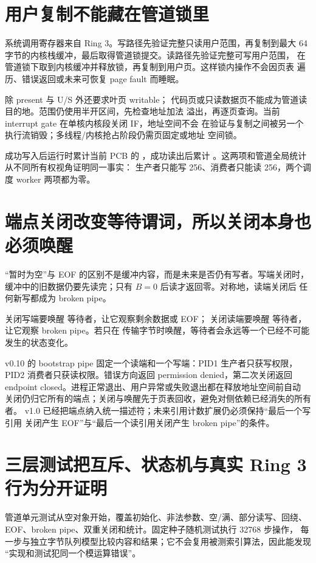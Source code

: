 \section{用户复制不能藏在管道锁里}

系统调用寄存器来自 Ring 3。写路径先验证完整只读用户范围，再复制到最大
64 字节的内核栈缓冲，最后取得管道锁提交。读路径先验证完整可写用户范围，
在管道锁下取到内核缓冲并释放锁，再复制到用户页。这样锁内操作不会因页表
遍历、错误返回或未来可恢复 page fault 而睡眠。

 除 present 与 U/S 外还要求叶页 writable；
代码页或只读数据页不能成为管道读目的地。范围仍使用半开区间，先检查地址加法
溢出，再逐页查询。当前 interrupt gate 在单核内核段关闭 IF，地址空间不会
在验证与复制之间被另一个执行流销毁；多线程/内核抢占阶段仍需页固定或地址
空间锁。

成功写入后运行时累计当前 PCB 的 ，成功读出后累计
。这两项和管道全局统计从不同所有权视角证明同一事实：
生产者只能写 256、消费者只能读 256，两个调度 worker 两项都为零。

\section{端点关闭改变等待谓词，所以关闭本身也必须唤醒}

“暂时为空”与 EOF 的区别不是缓冲内容，而是未来是否仍有写者。写端关闭时，
缓冲中的旧数据仍要先读完；只有 \(B=0\) 后读才返回零。对称地，读端关闭后
任何新写都成为 broken pipe。

关闭写端要唤醒  等待者，让它观察剩余数据或 EOF；
关闭读端要唤醒  等待者，让它观察 broken pipe。若只在
传输字节时唤醒，等待者会永远等一个已经不可能发生的状态变化。

v0.10 的 bootstrap pipe 固定一个读端和一个写端：PID1 生产者只获写权限，
PID2 消费者只获读权限。错误方向返回 permission denied，第二次关闭返回
endpoint closed。进程正常退出、用户异常或失败退出都在释放地址空间前自动
关闭仍归它所有的端点；关闭与唤醒先于页表回收，避免对侧依赖已经消失的所有者。
v1.0 已经把端点纳入统一描述符；未来引用计数扩展仍必须保持“最后一个写引用
关闭产生 EOF”与“最后一个读引用关闭产生 broken pipe”的条件。

\section{三层测试把互斥、状态机与真实 Ring 3 行为分开证明}

管道单元测试从空对象开始，覆盖初始化、非法参数、空/满、部分读写、回绕、
EOF、broken pipe、双重关闭和统计。固定种子随机测试执行 32768 步操作，
每一步与独立字节队列模型比较内容和结果；它不会复用被测索引算法，因此能发现
“实现和测试犯同一个模运算错误”。

